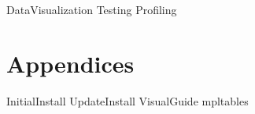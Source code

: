 \documentclass[opener-c,labs,blue,nociteref]{HJnewsiambook}
\begin{document}
{DataVisualization}
{Testing}
{Profiling}

\part{Appendices} %
\begin{appendices}
{InitialInstall}
{UpdateInstall}
{VisualGuide}
{mpltables}
\end{appendices}
\end{document}
